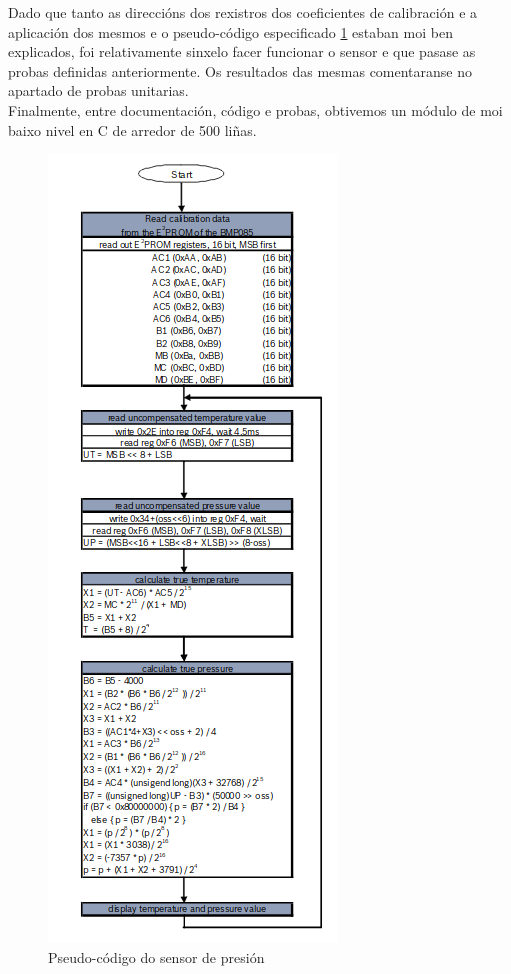    Dado que tanto as direccións dos rexistros dos coeficientes de calibración e
   a aplicación dos mesmos e o pseudo-código especificado
   \ref{figura:Bmp085PseudoCodigo} estaban moi ben explicados, foi relativamente
   sinxelo facer funcionar o sensor e que pasase as probas definidas
   anteriormente. Os resultados das mesmas comentaranse no apartado de probas
   unitarias. \\
   
   Finalmente, entre documentación, código e probas, obtivemos un módulo de moi
   baixo nivel en C de arredor de 500 liñas. \\
   
   \begin{figure}[htbp]
    \centering
    \includegraphics[scale=0.6, keepaspectratio=true]{./imagenes/bmp085-pseudocodigo.png}
    \caption{Pseudo-código do sensor de presión}
    \label{figura:Bmp085PseudoCodigo}
   \end{figure}
   
